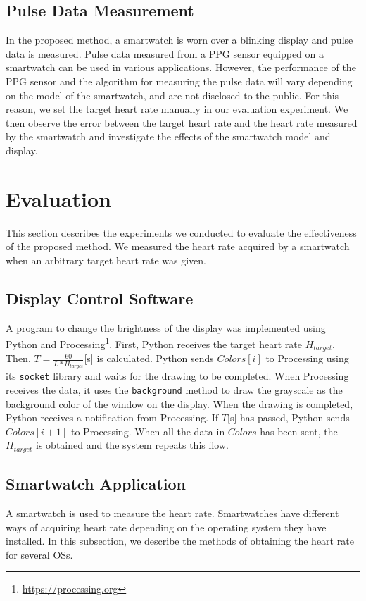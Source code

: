 \documentclass[sigconf]{acmart}
\begin{document}
\subsection{Pulse Data Measurement}
In the proposed method, a smartwatch is worn over a blinking display and pulse data is measured. Pulse data measured from a PPG sensor equipped on a smartwatch can be used in various applications. However, the performance of the PPG sensor and the algorithm for measuring the pulse data will vary depending on the model of the smartwatch, and are not disclosed to the public. For this reason, we set the target heart rate manually in our evaluation experiment. We then observe the error between the target heart rate and the heart rate measured by the smartwatch and investigate the effects of the smartwatch model and display.



\section{Evaluation}
\label{sec:evaluation}
This section describes the experiments we conducted to evaluate the effectiveness of the proposed method. We measured the heart rate acquired by a smartwatch when an arbitrary target heart rate was given.

\subsection{Display Control Software}
\label{subsec:software}
A program to change the brightness of the display was implemented using Python and Processing\footnote{\url{https://processing.org}}. First, Python receives the target heart rate $H_{target}$. Then, $T=\frac{60}{L * H_{target}}$[s] is calculated. Python sends $Colors[i]$ to Processing using its \texttt{socket} library and waits for the drawing to be completed. When Processing receives the data, it uses the \texttt{background} method to draw the grayscale as the background color of the window on the display. When the drawing is completed, Python receives a notification from Processing. If $T$[s] has passed, Python sends $Colors[i+1]$ to Processing. When all the data in $Colors$ has been sent, the $H_{target}$ is obtained and the system repeats this flow.


\subsection{Smartwatch Application}
\label{subsec:wearos}
A smartwatch is used to measure the heart rate. Smartwatches have different ways of acquiring heart rate depending on the operating system they have installed. In this subsection, we describe the methods of obtaining the heart rate for several OSs.
\end{document}
